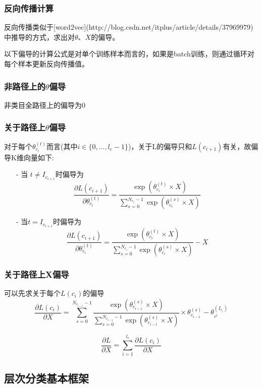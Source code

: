 \subsubsection{反向传播计算}
反向传播类似于[word2vec](http://blog.csdn.net/itplus/article/details/37969979)  中推导的方式，求出对$\theta、X$的偏导。
\par 以下偏导的计算公式是对单个训练样本而言的，如果是batch训练，则通过循环对每个样本更新反向传播值。
\subsubsection{非路径上的$\theta$偏导}
非类目全路径上的偏导为0
\subsubsection{关于路径上$\theta$偏导}
对于每个$\theta_{c_{i}}^{(t)}$而言(其中$i \in \{0,\dots,l_{c}-1\}$)，关于L的偏导只和$L(c_{i+1})$有关，故偏导K维向量如下:
\begin{itemize}
\item[-] 当 $t\neq I_{c_{i+1}}$时偏导为
$$\frac{\partial L(c_{i+1})} {\partial \theta_{c_{i}}^{(t)}} = \frac{\exp(\theta_{c_{i}}^{(t)}\times X)}{\sum_{s=0}^{N_{c_{i}}-1} \exp(\theta_{c_{i}}^{(s)}\times X)}$$
\item[-] 当$t= I_{c_{i+1}}$时偏导为
$$\frac{\partial L(c_{i+1})}{\partial \theta_{c_{i}}^{(t)}}=\dfrac{\exp(\theta_{c_{i}}^{(t)}\times X)}
{\sum_{s=0}^{N_{c_{i}}-1}\exp(\theta_{c_{i}}^{(s)}\times X)}-X$$
\end{itemize}
\subsubsection{关于路径上X偏导}
可以先求关于每个$L(c_{i})$的偏导
$$\frac{\partial L(c_{i}) }{\partial X} =\sum_{s=0}^{N_{c_{i-1}}-1} \dfrac{\exp(\theta_{c_{i-1}}^{(s)}\times X)}{\sum_{s=0}^{N_{c_{i-1}}-1}\exp(\theta^{(s)}_{c_{i-1}}\times X)} \times \theta^{(s)}_{c_{i-1}}-\theta_{c^{i}}^{(I_{c_{i}})}$$

$$\frac{\partial L}{\partial X} = \sum_{i=1}^{l_{c}} \frac{\partial L(c_{i}) }{\partial X}$$


\subsection{层次分类基本框架}


